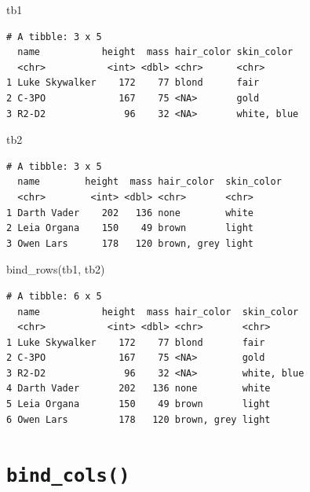 \documentclass[
  letterpaper,
]{ctexbook}
\newenvironment{Shaded}{\begin{snugshade}}{\end{snugshade}}
\newcommand{\FunctionTok}[1]{\textcolor[rgb]{0.28,0.35,0.67}{#1}}
\newcommand{\NormalTok}[1]{\textcolor[rgb]{0.00,0.23,0.31}{#1}}
\begin{document}
\begin{Shaded}
\begin{Highlighting}[]
\NormalTok{tb1}
\end{Highlighting}
\end{Shaded}

\begin{verbatim}
# A tibble: 3 x 5
  name           height  mass hair_color skin_color 
  <chr>           <int> <dbl> <chr>      <chr>      
1 Luke Skywalker    172    77 blond      fair       
2 C-3PO             167    75 <NA>       gold       
3 R2-D2              96    32 <NA>       white, blue
\end{verbatim}

\begin{Shaded}
\begin{Highlighting}[]
\NormalTok{tb2}
\end{Highlighting}
\end{Shaded}

\begin{verbatim}
# A tibble: 3 x 5
  name        height  mass hair_color  skin_color
  <chr>        <int> <dbl> <chr>       <chr>     
1 Darth Vader    202   136 none        white     
2 Leia Organa    150    49 brown       light     
3 Owen Lars      178   120 brown, grey light     
\end{verbatim}

\begin{Shaded}
\begin{Highlighting}[]
\FunctionTok{bind\_rows}\NormalTok{(tb1, tb2)}
\end{Highlighting}
\end{Shaded}

\begin{verbatim}
# A tibble: 6 x 5
  name           height  mass hair_color  skin_color 
  <chr>           <int> <dbl> <chr>       <chr>      
1 Luke Skywalker    172    77 blond       fair       
2 C-3PO             167    75 <NA>        gold       
3 R2-D2              96    32 <NA>        white, blue
4 Darth Vader       202   136 none        white      
5 Leia Organa       150    49 brown       light      
6 Owen Lars         178   120 brown, grey light      
\end{verbatim}

\hypertarget{bind_cols}{%
\section{\texorpdfstring{\texttt{bind\_cols()}}{bind\_cols()}}\label{bind_cols}}
\end{document}
